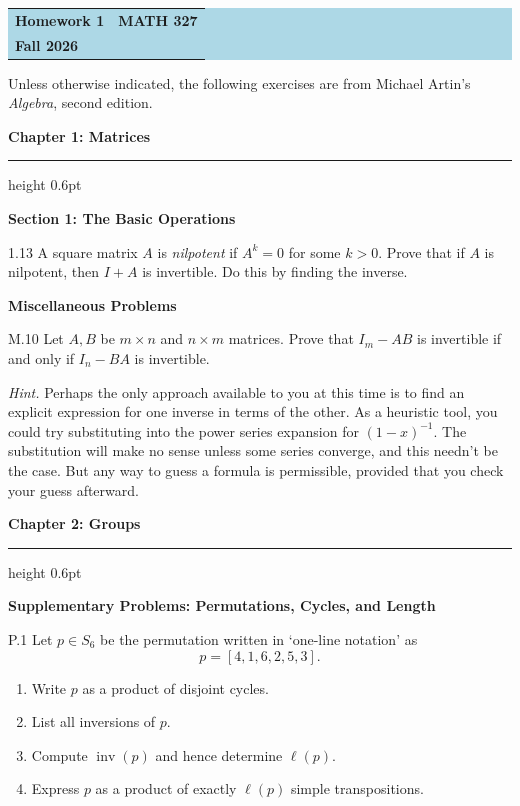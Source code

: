 \documentclass[11pt]{article}
\newcommand{\chapterheading}[1]{%
  \par\vspace{0.5em}
  {\color{courseblue}\Large\bfseries #1}\par\vspace{0.35em}
  {\color{boxborder}\hrule height 0.6pt}\vspace{0.35em}
}
\newcommand{\sectionheading}[1]{%
  \vspace{0.25em}
  {\color{darkgray}\large\bfseries #1}\par
}
\begin{document}
\begin{center}
  \colorbox{lightblue}{%
    \begin{minipage}{0.92\textwidth}
      \vspace{0.6em}
      \begin{tabular*}{\textwidth}{@{\extracolsep{\fill}}lr}
        {\color{courseblue}\bfseries\LARGE Homework 1} &
        {\color{courseblue}\bfseries\LARGE MATH 327}\\[0.4em]
        \multicolumn{2}{l}{\color{darkgray}\bfseries Fall 2026}
      \end{tabular*}
      \vspace{0.5em}
    \end{minipage}}
\end{center}

\vspace{0.5em}

Unless otherwise indicated, the following exercises are from Michael Artin's
\emph{Algebra}, second edition.

\chapterheading{Chapter 1: Matrices}

\sectionheading{Section 1: The Basic Operations}

\begin{exercise}{1.13}
A square matrix $A$ is \emph{nilpotent} if $A^k=0$ for some $k>0$.
Prove that if $A$ is nilpotent, then $I+A$ is invertible. Do this by
finding the inverse.
\end{exercise}

\sectionheading{Miscellaneous Problems}

\begin{exercise}{M.10}
Let $A,B$ be $m\times n$ and $n\times m$ matrices. Prove that
$I_m-AB$ is invertible if and only if $I_n-BA$ is invertible.

\textit{Hint.} Perhaps the only approach available to you at this time is
to find an explicit expression for one inverse in terms of the other. As a
heuristic tool, you could try substituting into the power series expansion
for $(1-x)^{-1}$. The substitution will make no sense unless some series
converge, and this needn't be the case. But any way to guess a formula is
permissible, provided that you check your guess afterward.
\end{exercise}

\chapterheading{Chapter 2: Groups}

\sectionheading{Supplementary Problems: Permutations, Cycles, and Length}

\begin{exercise}{P.1}
Let $p\in S_6$ be the permutation written in `one-line notation' as
\[
p=[4,1,6,2,5,3].
\]
\begin{enumerate}[label=\textbf{(\alph*)}]
  \item Write $p$ as a product of disjoint cycles.
  \item List all inversions of $p$.
  \item Compute $\operatorname{inv}(p)$ and hence determine $\ell(p)$.
  \item Express $p$ as a product of exactly $\ell(p)$ simple
        transpositions.
\end{enumerate}
\end{exercise}
\end{document}
